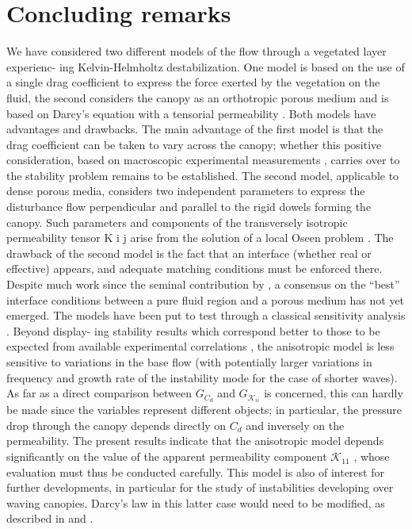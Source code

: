 \section{Concluding remarks}
We have considered two different models of the flow through a vegetated layer experienc-
ing Kelvin-Helmholtz destabilization. One model is based on the use of a single drag coefficient
to express the force exerted by the vegetation on the fluid, the second considers the canopy as
an orthotropic porous medium and is based on Darcy’s equation with a tensorial permeability \citet{zampogna2016fluid}. 
Both models have advantages and drawbacks. The main advantage of the first model is that the
drag coefficient can be taken to vary across the canopy; whether this positive consideration, based
on macroscopic experimental measurements \citet{ghisalberti2002mixing} \citet{ghisalberti2004limited} \citet{ghisalberti2005mass},  carries over to the stability problem remains to
be established. The second model, applicable to dense porous media, considers two independent
parameters to express the disturbance flow perpendicular and parallel to the rigid dowels forming
the canopy. Such parameters and components of the transversely isotropic permeability tensor K i j
arise from the solution of a local Oseen problem \citet{zampogna2016fluid}. The drawback of the second model is the
fact that an interface (whether real or effective) appears, and adequate matching conditions must
be enforced there. Despite much work since the seminal contribution by \citet{beaver}, a
consensus on the “best” interface conditions between a pure fluid region and a porous medium has
not yet emerged.
The models have been put to test through a classical sensitivity analysis \citet{bottaro2003effect}. Beyond display-
ing stability results which correspond better to those to be expected from available experimental
correlations \citet{raupach1996coherent} \citet{zampogna2016instability}, the anisotropic model is less sensitive to variations in the base flow (with potentially
larger variations in frequency and growth rate of the instability mode for the case of shorter waves).
As far as a direct comparison between $G_{C_d}$ and $G_{\mathcal{K}_{ii}}$ is concerned, this can hardly be made since
the variables represent different objects; in particular, the pressure drop through the canopy depends
directly on $C_d$ and inversely on the permeability. The present results indicate that the anisotropic
model depends significantly on the value of the apparent \citet{zampogna2016fluid} permeability component $\mathcal{K}_{11}$ , whose
evaluation must thus be conducted carefully. This model is also of interest for further developments,
in particular for the study of instabilities developing over waving canopies. Darcy’s law in this latter
case would need to be modified, as described in \citet{mei2010homogenization} and \citet{zampognaMech}.


